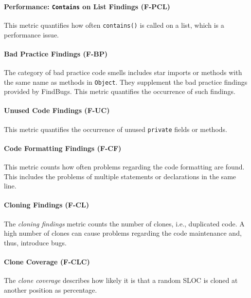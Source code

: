 \documentclass{scrartcl}
\begin{document}
\paragraph{Performance: \texttt{Contains} on List Findings (F-PCL)}

This metric quantifies how often \texttt{contains()} is called on a list, which
is a performance issue.

\paragraph{Bad Practice Findings (F-BP)}

The category of bad practice code smells includes star imports or methods with
the same name as methods in \texttt{Object}. They supplement the bad practice
findings provided by FindBugs. This metric quantifies the occurrence of such
findings.

\paragraph{Unused Code Findings (F-UC)}

This metric quantifies the occurrence of unused \texttt{private} fields or
methods.

\paragraph{Code Formatting Findings (F-CF)}

This metric counts how often problems regarding the code formatting are found.
This includes the problems of multiple statements or declarations in the same
line.

\paragraph{Cloning Findings (F-CL)}

The \emph{cloning findings} metric counts the number of clones, i.e., duplicated
code. A high number of clones can cause problems regarding the code maintenance
and, thus, introduce bugs.

\paragraph{Clone Coverage (F-CLC)}

The \emph{clone coverage} describes how likely it is that a random SLOC is
cloned at another position as percentage.
\end{document}
